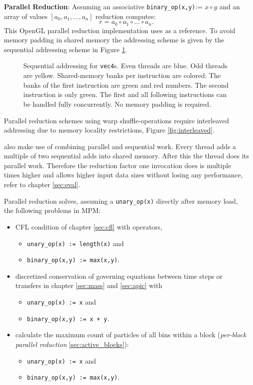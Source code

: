 \documentclass[m,times]{cgMA}
\begin{document}
\textbf{Parallel Reduction}: Assuming an associative \texttt{binary\_op(x,y)}:= $x \circ y$ and an array of values $\left[a_0,a_1, ... ,a_n\right]$ reduction computes:
\begin{equation}
  r = a_0 \circ a_1 \circ ... \circ a_n.
\end{equation}
This OpenGL parallel reduction implementation uses \cite{NVIDIA:PARALLEL_REDUCTION} as a reference. To avoid memory padding in shared memory the addressing scheme is given by the sequential addressing scheme in Figure \ref{fig:sequential}.
\begin{figure}[htbp]
    \centering
  
  \caption{Sequential addressing for \texttt{vec4}s. Even threads are blue. Odd threads are yellow. Shared-memory banks per instruction are colored: The banks of the first instruction are green and red numbers. The second instruction is only green. The first and all following instructions can be handled fully concurrently. No memory padding is required.}
\label{fig:sequential}
\end{figure}

Parallel reduction schemes using warp shuffle-operations require interleaved addressing due to memory locality restrictions, Figure \ref{fig:interleaved}. \cite{NVIDIA:SHUFFLE}

\cite{NVIDIA:PARALLEL_REDUCTION} also make use of combining parallel and sequential work. Every thread adds a multiple of two sequential adds into shared memory. After this the thread does its parallel work. Therefore the reduction factor one invocation does is multiple times higher and allows higher input data sizes without losing any performance, refer to chapter \ref{sec:eval}.

Parallel reduction solves, assuming a \texttt{unary\_op(x)} directly after memory load, the following problems in MPM:
\begin{itemize}
  \item CFL condition of chapter \ref{sec:cfl} with operators,
  \begin{itemize}
  \item \texttt{unary\_op(x) := length(x)} and
  \item \texttt{binary\_op(x,y) := max(x,y)}.
  \end{itemize}
\item discretized conservation of governing equations between time steps or transfers in chapter \ref{sec:mass} and \ref{sec:apic} with
\begin{itemize}
  \item \texttt{unary\_op(x) := x} and
  \item \texttt{binary\_op(x,y) := x + y}.
  \end{itemize}
\item calculate the maximum count of particles of all bins within a block (\textit{per-block parallel reduction} \ref{sec:active_blocks}):
\begin{itemize}
  \item \texttt{unary\_op(x) := x} and
  \item \texttt{binary\_op(x,y) := max(x,y)}.
\end{itemize}
\end{itemize}
\end{document}
